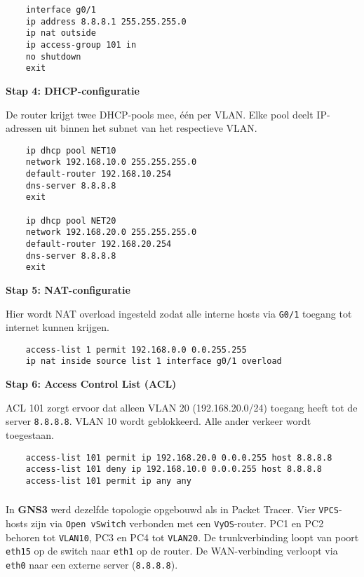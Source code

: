 \begin{verbatim}
    interface g0/1
    ip address 8.8.8.1 255.255.255.0
    ip nat outside
    ip access-group 101 in
    no shutdown
    exit
\end{verbatim}

\textbf{Stap 4: DHCP-configuratie}

De router krijgt twee DHCP-pools mee, één per VLAN. Elke pool deelt IP-adressen uit binnen het subnet van het respectieve VLAN.

\begin{verbatim}
    ip dhcp pool NET10
    network 192.168.10.0 255.255.255.0
    default-router 192.168.10.254
    dns-server 8.8.8.8
    exit
    
    ip dhcp pool NET20
    network 192.168.20.0 255.255.255.0
    default-router 192.168.20.254
    dns-server 8.8.8.8
    exit
\end{verbatim}

\textbf{Stap 5: NAT-configuratie}

Hier wordt NAT overload ingesteld zodat alle interne hosts via \texttt{G0/1} toegang tot internet kunnen krijgen.

\begin{verbatim}
    access-list 1 permit 192.168.0.0 0.0.255.255
    ip nat inside source list 1 interface g0/1 overload
\end{verbatim}

\textbf{Stap 6: Access Control List (ACL)}

ACL 101 zorgt ervoor dat alleen VLAN 20 (192.168.20.0/24) toegang heeft tot de server \texttt{8.8.8.8}. VLAN 10 wordt geblokkeerd. Alle ander verkeer wordt toegestaan.

\begin{verbatim}
    access-list 101 permit ip 192.168.20.0 0.0.0.255 host 8.8.8.8
    access-list 101 deny ip 192.168.10.0 0.0.0.255 host 8.8.8.8
    access-list 101 permit ip any any
\end{verbatim}


\subsubsection{}

In \textbf{GNS3} werd dezelfde topologie opgebouwd als in Packet Tracer. Vier \texttt{VPCS}-hosts zijn via \texttt{Open vSwitch} verbonden met een \texttt{VyOS}-router. PC1 en PC2 behoren tot \texttt{VLAN10}, PC3 en PC4 tot \texttt{VLAN20}. De trunkverbinding loopt van poort \texttt{eth15} op de switch naar \texttt{eth1} op de router. De WAN-verbinding verloopt via \texttt{eth0} naar een externe server (\texttt{8.8.8.8}). 


